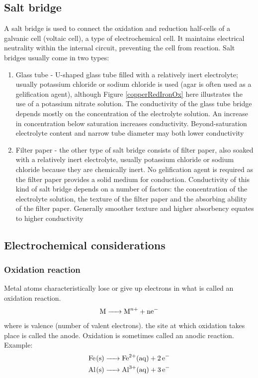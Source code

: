 \subsection{Salt bridge}
A salt bridge is used to connect the oxidation and reduction half-cells of a galvanic cell (voltaic cell), a type of electrochemical cell. It maintains electrical neutrality within the internal circuit, preventing the cell from reaction. Salt bridges usually come in two types:
\begin{enumerate}
    \item Glass tube - U-shaped glass tube filled with a relatively inert electrolyte; usually potassium chloride or sodium chloride is used (agar is often used as a gelification agent), although Figure \ref{copperRedIronOx} here illustrates the use of a potassium nitrate solution. The conductivity of the glass tube bridge depends mostly on the concentration of the electrolyte solution. An increase in concentration below saturation increases conductivity. Beyond-saturation electrolyte content and narrow tube diameter may both lower conductivity
    \item Filter paper - the other type of salt bridge consists of filter paper, also soaked with a relatively inert electrolyte, usually potassium chloride or sodium chloride because they are chemically inert. No gelification agent is required as the filter paper provides a solid medium for conduction. Conductivity of this kind of salt bridge depends on a number of factors: the concentration of the electrolyte solution, the texture of the filter paper and the absorbing ability of the filter paper. Generally smoother texture and higher absorbency equates to higher conductivity
\end{enumerate}
\subsection{Electrochemical considerations}
\subsubsection{Oxidation reaction}
Metal atoms characteristically lose or give up electrons in what is called an oxidation reaction.
\begin{equation}
    \ce{M -> M^n+ + ne^-}
\end{equation}
where  is valence (number of valent electrons). the site at which oxidation takes place is called the anode. Oxidation is sometimes called an anodic reaction. Example:
\begin{gather}
    \ce{Fe(s) -> Fe^2+(aq) + 2e^-}\\
    \ce{Al(s) -> Al^3+(aq) + 3e^-}
\end{gather}
